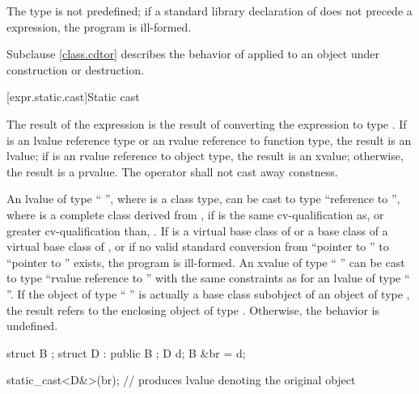 \pnum
The type  is not predefined;
if a standard library declaration of
 does not precede
a  expression, the program is ill-formed.

\pnum
\begin{note}
Subclause \ref{class.cdtor} describes the behavior of 
applied to an object under construction or destruction.
\end{note}

[expr.static.cast]{Static cast}

\pnum
{}%
%
The result of the expression  is the result of
converting the expression  to type .
%
%
If  is an lvalue reference type
or an rvalue reference to function type, the result is an lvalue;
if  is an rvalue reference to object type, the result is an xvalue;
otherwise, the result is a prvalue. The  operator shall not cast
away constness.

\pnum
{}%
%
An lvalue of type `` '', where  is a class
type, can be cast to type ``reference to  '', where
 is a complete class derived from ,
if  is the
same cv-qualification as, or greater cv-qualification than,
. If  is a virtual base class of 
or a base class of a virtual base class of ,
or if no valid standard conversion from ``pointer to ''
to ``pointer to '' exists, the program is ill-formed.
An xvalue of type
`` '' can be cast to type ``rvalue reference to
 '' with the same constraints as for an lvalue of
type `` ''. If the object
of type `` '' is actually a base class subobject of an object
of type , the result refers to the enclosing object of type
. Otherwise, the behavior is undefined.
\begin{example}
\begin{codeblock}
struct B { };
struct D : public B { };
D d;
B &br = d;

static_cast<D&>(br);            // produces lvalue denoting the original  object
\end{codeblock}
\end{example}

